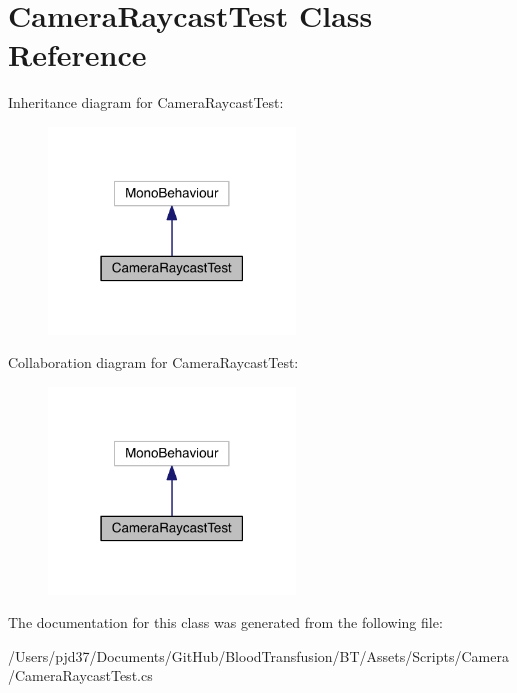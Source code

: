 \hypertarget{class_camera_raycast_test}{}\section{Camera\+Raycast\+Test Class Reference}
\label{class_camera_raycast_test}


Inheritance diagram for Camera\+Raycast\+Test\+:\nopagebreak
\begin{figure}[H]
\begin{center}
\leavevmode
\includegraphics[width=186pt]{class_camera_raycast_test__inherit__graph}
\end{center}
\end{figure}


Collaboration diagram for Camera\+Raycast\+Test\+:\nopagebreak
\begin{figure}[H]
\begin{center}
\leavevmode
\includegraphics[width=186pt]{class_camera_raycast_test__coll__graph}
\end{center}
\end{figure}


The documentation for this class was generated from the following file\+:\begin{DoxyCompactItemize}
\item 
/\+Users/pjd37/\+Documents/\+Git\+Hub/\+Blood\+Transfusion/\+B\+T/\+Assets/\+Scripts/\+Camera/Camera\+Raycast\+Test.\+cs\end{DoxyCompactItemize}
